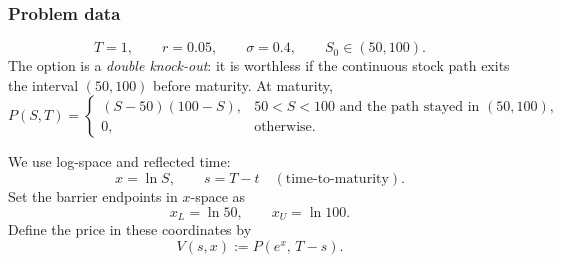 \documentclass{article}
\begin{document}
\subsubsection*{Problem data}
\[
T=1,\qquad r=0.05,\qquad \sigma=0.4,\qquad S_0\in(50,100).
\]
The option is a \emph{double knock-out}: it is worthless if the continuous stock path exits the interval $(50,100)$ before maturity.
At maturity,
\[
P(S,T)=
\begin{cases}
(S-50)(100-S), & 50<S<100 \text{ and the path stayed in }(50,100),\\
0, & \text{otherwise.}
\end{cases}
\]

We use log-space and reflected time:
\[
x=\ln S,\qquad s=T-t\quad(\text{time-to-maturity}).
\]
Set the barrier endpoints in $x$-space as
\[
x_L=\ln 50,\qquad x_U=\ln 100.
\]
Define the price in these coordinates by
\[
V(s,x):=P(e^x,\,T-s).
\]
\end{document}
